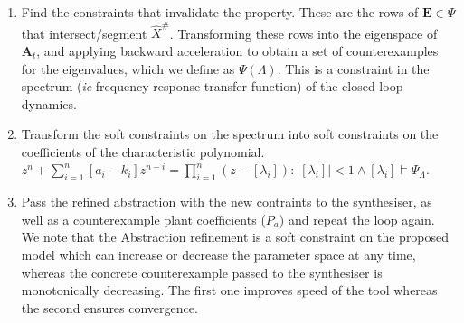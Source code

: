 \documentclass[runningheads,a4paper]{llncs}
\newcommand{\mat}[1]{\boldsymbol{#1}}
\begin{document}
\begin{enumerate}
\begin{enumerate}
\item Find the constraints that invalidate the property. These are the rows of $\mat{E} \in \Psi$ that intersect/segment $\hat{X}^\#$. Transforming these rows into the eigenspace of $\mat{A}_t$, and applying backward acceleration to obtain a set of counterexamples for the eigenvalues, which we define as $\Psi(\Lambda)$. This is a constraint in the spectrum (\emph{ie} frequency response transfer function) of the closed loop dynamics. 
\item Transform the soft constraints on the spectrum into soft constraints on the coefficients of the characteristic polynomial. 
$z^n+\sum_{i=1}^n[a_i-k_i]z^{n-i}=\prod_{i=1}^n (z-[\lambda_i]) : |[\lambda_i]|<1 \wedge [\lambda_i] \models \Psi_{\Lambda}$.
\item Pass the refined abstraction with the new contraints to the synthesiser, as well as a counterexample plant coefficients ($P_a$) and repeat the loop again. We note that the Abstraction refinement is a soft constraint on the proposed model which can increase or decrease the parameter space at any time, whereas the concrete counterexample passed to the synthesiser is monotonically decreasing. The first one improves speed of the tool whereas the second ensures convergence.

\end{enumerate} 
\end{enumerate}
\end{document}
